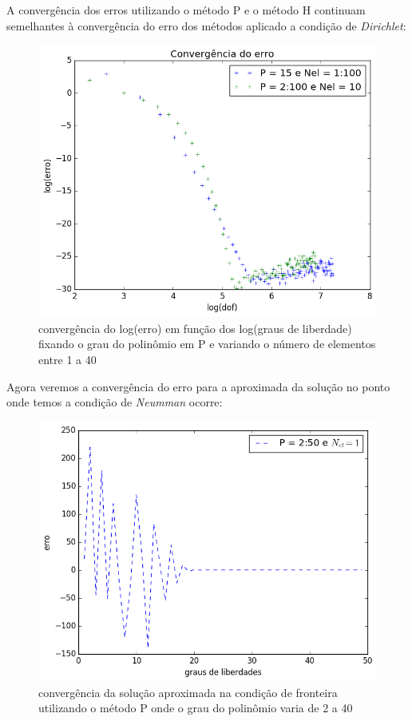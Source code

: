 A convergência dos erros utilizando o método P e o método H continuam semelhantes à convergência do erro dos métodos aplicado a condição de \emph{Dirichlet}:
\begin{figure}[H]
\centering
\includegraphics[width=1.0\textwidth,center]{figuras/convergencia_erro_Neumm.png}
\caption{convergência do log(erro) em função dos log(graus de liberdade) fixando o grau do polinômio em P e variando o número de elementos entre 1 a 40 } 
\end{figure}
 Agora veremos a convergência do erro para a aproximada da solução no ponto onde temos a condição de \emph{Neumman} ocorre:
 \begin{figure}[H]
\centering
\includegraphics[width=.6\textwidth,center]{figuras/convergencia_fronteira_neuman_P.png}
\caption{convergência da solução aproximada na condição de fronteira utilizando o método P onde o grau do polinômio varia de 2 a 40 } 
\end{figure}

